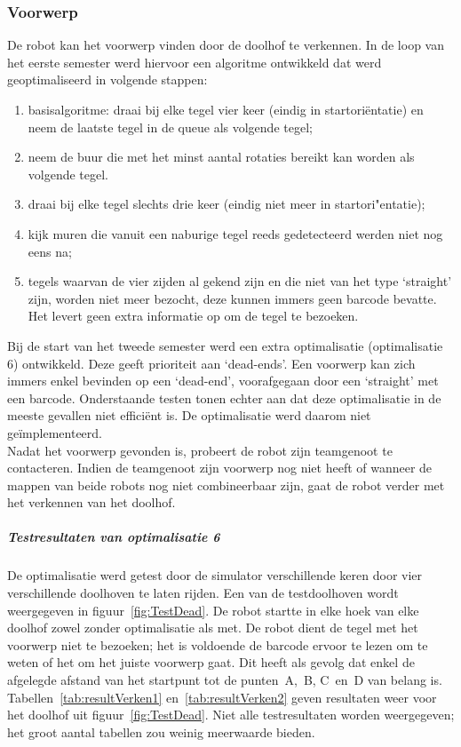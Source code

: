 \documentclass[eind]{penoverslag}
\begin{document}
\subsubsection{Voorwerp} %
\label{sssec:AlgoZoek}
De robot kan het voorwerp vinden door de doolhof te verkennen. In de loop van het eerste semester werd hiervoor een algoritme ontwikkeld dat werd geoptimaliseerd in volgende stappen: 

\begin{enumerate}
\item basisalgoritme: draai bij elke tegel vier keer (eindig in startori\"entatie) en neem de laatste tegel in de queue als volgende tegel;
\item neem de buur die met het minst aantal rotaties bereikt kan worden als volgende tegel.
\item draai bij elke tegel slechts drie keer (eindig niet meer in startori"entatie);
\item kijk muren die vanuit een naburige tegel reeds gedetecteerd werden niet nog eens na;
\item tegels waarvan de vier zijden al gekend zijn en die niet van het type `straight' zijn, worden niet meer bezocht, deze kunnen immers geen barcode bevatte. Het levert geen extra informatie op om de tegel te bezoeken.
\end{enumerate}

Bij de start van het tweede semester werd een extra optimalisatie (optimalisatie 6) ontwikkeld. Deze geeft prioriteit aan `dead-ends'. Een voorwerp kan zich immers enkel bevinden op een `dead-end', voorafgegaan door een `straight' met een barcode. Onderstaande testen tonen echter aan dat deze optimalisatie in de meeste gevallen niet effici\"ent is. De optimalisatie werd daarom niet ge\"implementeerd.\\

Nadat het voorwerp gevonden is, probeert de robot zijn teamgenoot te contacteren. Indien de teamgenoot zijn voorwerp nog niet heeft of wanneer de mappen van beide robots nog niet combineerbaar zijn, gaat de robot verder met het verkennen van het doolhof.

\subparagraph{Testresultaten van optimalisatie 6}
\label{par:AlgoZoekTest}

De optimalisatie werd getest door de simulator verschillende keren door vier verschillende doolhoven te laten rijden. Een van de testdoolhoven wordt weergegeven in figuur~\ref{fig:TestDead}. De robot startte in elke hoek van elke doolhof zowel zonder optimalisatie als met. De robot dient de tegel met het voorwerp niet te bezoeken; het is voldoende de barcode ervoor te lezen om te weten of het om het juiste voorwerp gaat. Dit heeft als gevolg dat enkel de afgelegde afstand van het startpunt tot de punten~A,~B, C~en~D van belang is. Tabellen~\ref{tab:resultVerken1} en~\ref{tab:resultVerken2} geven resultaten weer voor het doolhof uit figuur~\ref{fig:TestDead}. Niet alle testresultaten worden weergegeven; het groot aantal tabellen zou weinig meerwaarde bieden.\\
\end{document}
